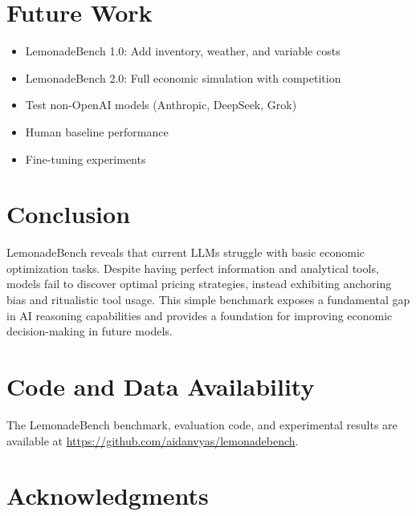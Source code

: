 \documentclass[11pt]{article}
\begin{document}

\section{Future Work}

\begin{itemize}
    \item LemonadeBench 1.0: Add inventory, weather, and variable costs
    \item LemonadeBench 2.0: Full economic simulation with competition
    \item Test non-OpenAI models (Anthropic, DeepSeek, Grok)
    \item Human baseline performance
    \item Fine-tuning experiments
\end{itemize}

\section{Conclusion}

LemonadeBench reveals that current LLMs struggle with basic economic optimization tasks. Despite having perfect information and analytical tools, models fail to discover optimal pricing strategies, instead exhibiting anchoring bias and ritualistic tool usage. This simple benchmark exposes a fundamental gap in AI reasoning capabilities and provides a foundation for improving economic decision-making in future models.

\section*{Code and Data Availability}

The LemonadeBench benchmark, evaluation code, and experimental results are available at \url{https://github.com/aidanvyas/lemonadebench}.

\section*{Acknowledgments}




\end{document}
